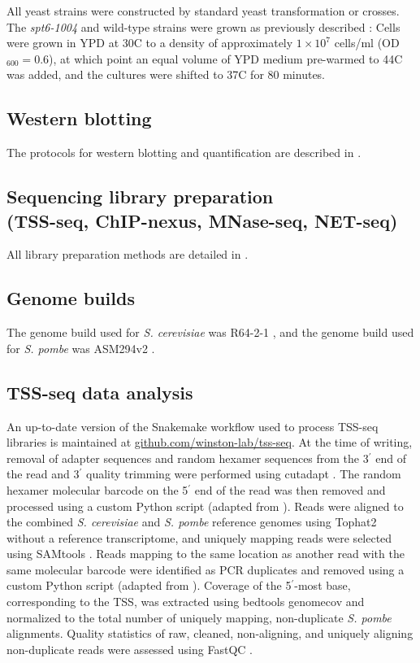 All yeast strains were constructed by standard yeast transformation or crosses.
The \textit{spt6-1004} and wild-type strains were grown as previously described \citep{cheung2008}: Cells were grown in YPD at 30\textdegree C to a density of approximately $1 \times 10^7$ cells/ml (OD$_{600} = 0.6$), at which point an equal volume of YPD medium pre-warmed to 44\textdegree C was added, and the cultures were shifted to 37\textdegree C for 80 minutes.

\subsection{Western blotting}

The protocols for western blotting and quantification are described in \citet{doris2018}.

\subsection{Sequencing library preparation\\(TSS-seq, ChIP-nexus, MNase-seq, NET-seq)}

All library preparation methods are detailed in \citet{doris2018}.

\subsection{Genome builds}

The genome build used for \textit{S. cerevisiae} was R64-2-1 \citep{engel2014}, and the genome build used for \textit{S. pombe} was ASM294v2 \citep{wood2002}.

\subsection{TSS-seq data analysis}
\label{subsec:tss_seq}

An up-to-date version of the Snakemake \citep{koster2012} workflow used to process TSS-seq libraries is maintained at \href{https://github.com/winston-lab/tss-seq}{github.com/winston-lab/tss-seq}.
At the time of writing, removal of adapter sequences and random hexamer sequences from the 3$^\prime$ end of the read and 3$^\prime$ quality trimming were performed using cutadapt \citep{martin2011}.
The random hexamer molecular barcode on the 5$^\prime$ end of the read was then removed and processed using a custom Python script (adapted from \citet{mayer2015}).
Reads were aligned to the combined \textit{S. cerevisiae} and \textit{S. pombe} reference genomes using Tophat2 \citep{kim2013} without a reference transcriptome, and uniquely mapping reads were selected using SAMtools \citep{li2009}.
Reads mapping to the same location as another read with the same molecular barcode were identified as PCR duplicates and removed using a custom Python script (adapted from \citet{mayer2015}).
Coverage of the 5$^\prime$-most base, corresponding to the TSS, was extracted using bedtools genomecov \citep{quinlan2010} and normalized to the total number of uniquely mapping, non-duplicate \textit{S. pombe} alignments.
Quality statistics of raw, cleaned, non-aligning, and uniquely aligning non-duplicate reads were assessed using FastQC \citep{andrews2010}.

